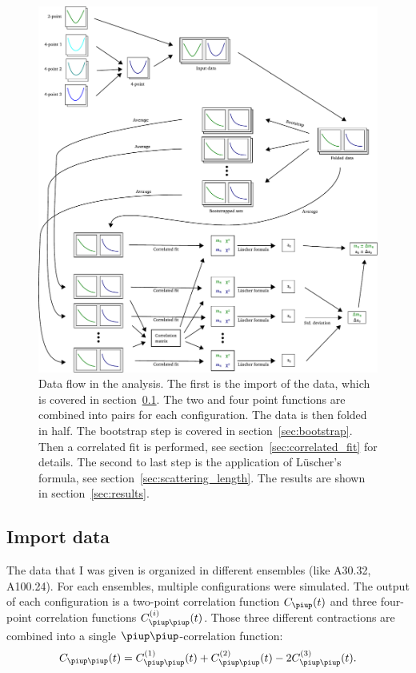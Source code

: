 \documentclass[11pt, english, fleqn, DIV=15, headinclude]{scrartcl}
\begin{document}
\begin{figure}[htbp]
    \centering
    \includegraphics[width=\linewidth]{sketches/Zeichnung.pdf}
    \caption{%
        Data flow in the analysis. The first is the import of the data, which
        is covered in section~\ref{sec:import}. The two and four point
        functions are combined into pairs for each configuration. The data is
        then folded in half. The bootstrap step is covered in
        section~\ref{sec:bootstrap}. Then a correlated fit is performed, see
        section~\ref{sec:correlated_fit} for details. The second to last step
        is the application of Lüscher's formula, see
        section~\ref{sec:scattering_length}. The results are shown in
        section~\ref{sec:results}.
    }
    \label{fig:analysis-flow}
\end{figure}


\subsection{Import data}
\label{sec:import}

The data that I was given is organized in different ensembles (like A30.32,
A100.24). For each ensembles, multiple configurations were simulated. The
output of each configuration is a two-point correlation function $C_\piup(t)$
and three four-point correlation functions $C_{\piup\piup}^{(i)}(t)$. Those
three different contractions are combined into a single
$\piup\piup$-correlation function:
\[
    C_{\piup\piup}(t) = C_{\piup\piup}^{(1)}(t) + C_{\piup\piup}^{(2)}(t)
    - 2 C_{\piup\piup}^{(3)}(t).
\]
\end{document}
